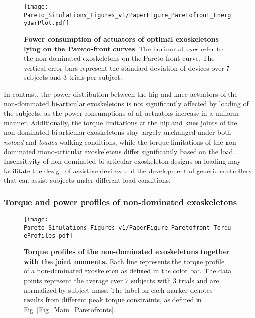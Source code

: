 \documentclass[10pt,letterpaper]{article}
\begin{document}
\begin{figure*}[h!]
	\centering
	\texttt{[image: Pareto\_Simulations\_Figures\_v1/PaperFigure\_Paretofront\_EnergyBarPlot.pdf]}
	\vspace{-3mm}
	\caption{{\small\textbf{Power consumption of actuators of optimal exoskeletons lying on the Pareto-front curves}. The horizontal axes refer to the non-dominated exoskeletons on the Pareto-front curve. The vertical error bars represent the standard deviation of devices over 7 subjects and 3 trials per subject.}}
	\label{Fig_Paretofronts_Actuators_EnergyBarPlot}
\end{figure*}

In contrast, the power distribution between the hip and knee actuators of the non-dominated bi-articular exoskeletons is not significantly affected by loading of the subjects, as the power consumptions of all actuators increase in a uniform manner. Additionally, the torque limitations at the hip and knee joints of the non-dominated bi-articular exoskeletons stay largely unchanged under both \emph{noload} and \emph{loaded} walking conditions, while the torque limitations of the non-dominated  mono-articular exoskeletons differ significantly based on the load. Insensitivity of non-dominated  bi-articular exoskeleton designs on loading may facilitate the design of assistive devices and the development of generic controllers that can assist subjects under different load conditions.

\subsubsection*{Torque and power profiles of non-dominated exoskeletons}

\begin{figure*}[t!]
	\centering
	\texttt{[image: Pareto\_Simulations\_Figures\_v1/PaperFigure\_Paretofront\_TorqueProfiles.pdf]}
	\vspace{-4mm}
	\caption{{\small\textbf{Torque profiles of the non-dominated exoskeletons together with the joint moments.} Each line represents the torque profile of a non-dominated exoskeleton as defined in the color bar. The data points represent the average over 7 subjects with 3 trials and are normalized by subject mass. The label on each marker denotes results from different peak torque constraints, as defined in Fig~\ref{Fig_Main_Paretofronts}. }}
	\label{Fig_Paretofronts_Torque_Profiles}
\end{figure*} \vspace{-2mm}
\end{document}
